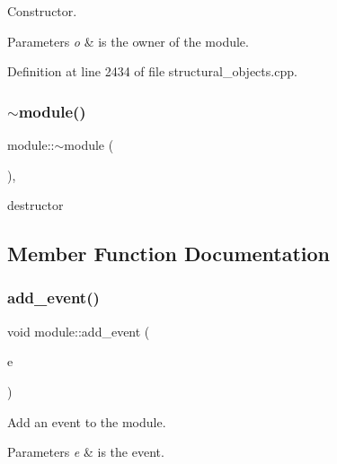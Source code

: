 Constructor. 


\begin{DoxyParams}{Parameters}
{\em o} & is the owner of the module. \\
\hline
\end{DoxyParams}


Definition at line 2434 of file structural\+\_\+objects.\+cpp.

\mbox{\label{classmodule_acaee0dee4568e07a61e47c4e6f2cc7a0}} 
\subsubsection{\texorpdfstring{$\sim$module()}{~module()}}
{\footnotesize\ttfamily module\+::$\sim$module (\begin{DoxyParamCaption}{ }\end{DoxyParamCaption})\hspace{0.3cm}{\ttfamily [override]}, {\ttfamily [default]}}



destructor 



\subsection{Member Function Documentation}
\mbox{\label{classmodule_a85a9c0cad60665cfae99c1fd8ff82332}} 
\subsubsection{\texorpdfstring{add\+\_\+event()}{add\_event()}}
{\footnotesize\ttfamily void module\+::add\+\_\+event (\begin{DoxyParamCaption}\item[{\hyperlink{structural__objects_8hpp_a8ea5f8cc50ab8f4c31e2751074ff60b2}{structural\+\_\+object\+Ref}}]{e }\end{DoxyParamCaption})}



Add an event to the module. 


\begin{DoxyParams}{Parameters}
{\em e} & is the event. \\
\hline
\end{DoxyParams}


